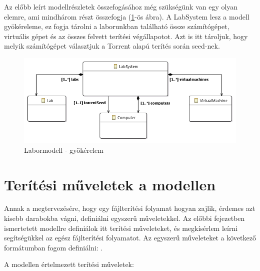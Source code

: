 Az előbb leírt modellrészletek összefogásához még szükségünk van egy olyan elemre, ami mindhárom részt összefogja (\ref{fig:designmodelroot}-ös ábra). A LabSystem lesz a modell gyökéreleme, ez fogja tárolni a laborunkban található össze számítógépet, virtuális gépet és az összes felvett terítési végállapotot. Azt is itt tároljuk, hogy melyik számítógépet választjuk a Torrent alapú terítés során seed-nek.

\begin{figure}[h!]
	\centering
	\includegraphics[width=130mm, keepaspectratio]{figures/design_modelroot.png}
	\caption{Labormodell - gyökérelem}
	\label{fig:designmodelroot}
\end{figure}

\section{Terítési műveletek a modellen}
\label{distrops}

Annak a megtervezésére, hogy egy fájlterítési folyamat hogyan zajlik, érdemes azt kisebb darabokba vágni, definiálni egyszerű műveletekkel.
Az előbbi fejezetben ismertetett modellre definiálok itt terítési műveleteket, és megkísérlem leírni segítségükkel az egész fájlterítési folyamatot.
Az egyszerű műveleteket a következő formátumban fogom definiálni: .


A modellen értelmezett terítési műveletek:

